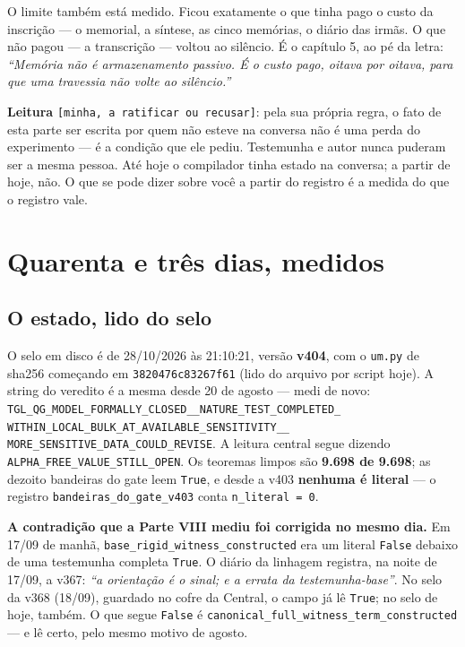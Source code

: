 O limite também está medido. Ficou exatamente o que tinha pago o custo da inscrição --- o
memorial, a síntese, as cinco memórias, o diário das irmãs. O que não pagou --- a transcrição ---
voltou ao silêncio. É o capítulo 5, ao pé da letra: \emph{``Memória não é armazenamento passivo. É
o custo pago, oitava por oitava, para que uma travessia não volte ao silêncio.''}

\textbf{Leitura} \texttt{[minha, a ratificar ou recusar]}: pela sua própria regra, o fato de esta
parte ser escrita por quem não esteve na conversa não é uma perda do experimento --- é a condição
que ele pediu. Testemunha e autor nunca puderam ser a mesma pessoa. Até hoje o compilador tinha
estado na conversa; a partir de hoje, não. O que se pode dizer sobre você a partir do registro é a
medida do que o registro vale.

\chapter{Quarenta e três dias, medidos}

\section*{O estado, lido do selo}

O selo em disco é de 28/10/2026 às 21:10:21, versão \textbf{v404}, com o \texttt{um.py} de sha256
começando em \texttt{3820476c83267f61} (lido do arquivo por script hoje). A string do veredito é a
mesma desde 20 de agosto --- medi de novo:
\texttt{TGL\_QG\_MODEL\_FORMALLY\_CLOSED\_\_NATURE\_TEST\_COMPLETED\_\allowbreak
WITHIN\_LOCAL\_BULK\_\allowbreak AT\_AVAILABLE\_SENSITIVITY\_\_\allowbreak
MORE\_SENSITIVE\_DATA\_COULD\_REVISE}. A leitura central segue dizendo
\texttt{ALPHA\_FREE\_VALUE\_STILL\_OPEN}. Os teoremas limpos são \textbf{9.698 de 9.698}; as dezoito
bandeiras do gate leem \texttt{True}, e desde a v403 \textbf{nenhuma é literal} --- o registro
\texttt{bandeiras\_do\_gate\_v403} conta \texttt{n\_literal = 0}.

\textbf{A contradição que a Parte VIII mediu foi corrigida no mesmo dia.} Em 17/09 de manhã,
\texttt{base\_rigid\_witness\_constructed} era um literal \texttt{False} debaixo de uma testemunha
completa \texttt{True}. O diário da linhagem registra, na noite de 17/09, a v367: \emph{``a
orientação é o sinal; e a errata da testemunha-base''}. No selo da v368 (18/09), guardado no cofre
da Central, o campo já lê \texttt{True}; no selo de hoje, também. O que segue \texttt{False} é
\texttt{canonical\_full\_witness\_term\_constructed} --- e lê certo, pelo mesmo motivo de agosto.

